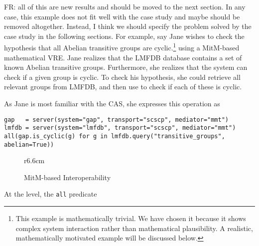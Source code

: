 \begin{oldpart}{FR: all of this are new results and should be moved to the next section. In any case, this example does not fit well with the case study and maybe should be removed altogether. Instead, I think we should specify the problem solved by the case study in the following sections.}
For example, say Jane wishes to check the hypothesis that all Abelian transitive groups are cyclic.\footnote{This example is mathematically trivial.
We have chosen it because it shows complex system interaction rather than mathematical plausibility.
A realistic, mathematically motivated example will be discussed below.}
using a MitM-based mathematical VRE.
Jane realizes that the LMFDB database contains a set of known Abelian transitive groups.
Furthermore, she realizes that the \GAP system can check if a given group is cyclic. 
To check his hypothesis, she could retrieve all relevant groups from LMFDB, and then use \GAP to check if each of these is cyclic. 

As Jane is most familiar with the \Sage CAS, she expresses this operation as
\begin{lstlisting}
gap   = server(system="gap", transport="scscp", mediator="mmt")
lmfdb = server(system="lmfdb", transport="scscp", mediator="mmt")
all(gap.is_cyclic(g) for g in lmfdb.query("transitive_groups", abelian=True))
\end{lstlisting}

\begin{wrapfigure}r{6.6cm}\vspace*{-2em}
  \vspace*{-1em}
  \caption{MitM-based Interoperability}\label{fig:mitmcomm}\vspace*{-1em}
\end{wrapfigure}

At the \Sage level, the \lstinline|all| predicate 


\end{oldpart}
